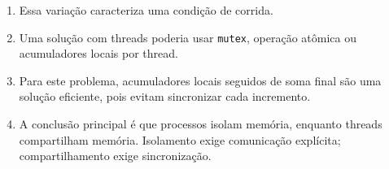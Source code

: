 \begin{enumerate}
    \item Essa variação caracteriza uma condição de corrida.

    \item Uma solução com threads poderia usar \texttt{mutex}, operação atômica ou acumuladores locais por thread.

    \item Para este problema, acumuladores locais seguidos de soma final são uma solução eficiente, pois evitam sincronizar cada incremento.

    \item A conclusão principal é que processos isolam memória, enquanto threads compartilham memória. Isolamento exige comunicação explícita; compartilhamento exige sincronização.
\end{enumerate}
